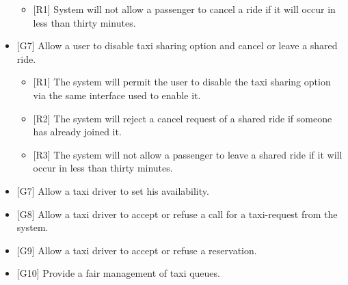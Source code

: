 \begin{itemize}
			\begin{itemize}
				\item {[R1]} System will not allow a passenger to cancel a ride if it will occur in less than thirty minutes.
			\end{itemize}
		\item {[G7]} Allow a user to disable taxi sharing option and cancel or leave a shared ride.
			\begin{itemize}
				\item {[R1]} The system will permit the user to disable the taxi sharing option via the same interface used to enable it.
				\item {[R2]} The system will reject a cancel request of a shared ride if someone has already joined it.
				\item {[R3]} The system will not allow a passenger to leave a shared ride if it will occur in less than thirty minutes.
			\end{itemize}
		\item {[G7]} Allow a taxi driver to set his availability.
		\item {[G8]} Allow a taxi driver to accept or refuse a call for a taxi-request from the system.
		\item {[G9]} Allow a taxi driver to accept or refuse a reservation.
		\item {[G10]} Provide a fair management of taxi queues.
	\end{itemize}